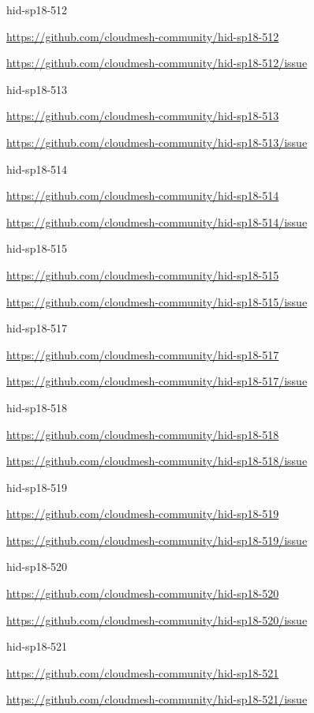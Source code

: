 hid-sp18-512

\url{https://github.com/cloudmesh-community/hid-sp18-512}

\url{https://github.com/cloudmesh-community/hid-sp18-512/issue}


hid-sp18-513

\url{https://github.com/cloudmesh-community/hid-sp18-513}

\url{https://github.com/cloudmesh-community/hid-sp18-513/issue}


hid-sp18-514

\url{https://github.com/cloudmesh-community/hid-sp18-514}

\url{https://github.com/cloudmesh-community/hid-sp18-514/issue}


hid-sp18-515

\url{https://github.com/cloudmesh-community/hid-sp18-515}

\url{https://github.com/cloudmesh-community/hid-sp18-515/issue}


hid-sp18-517

\url{https://github.com/cloudmesh-community/hid-sp18-517}

\url{https://github.com/cloudmesh-community/hid-sp18-517/issue}


hid-sp18-518

\url{https://github.com/cloudmesh-community/hid-sp18-518}

\url{https://github.com/cloudmesh-community/hid-sp18-518/issue}


hid-sp18-519

\url{https://github.com/cloudmesh-community/hid-sp18-519}

\url{https://github.com/cloudmesh-community/hid-sp18-519/issue}


hid-sp18-520

\url{https://github.com/cloudmesh-community/hid-sp18-520}

\url{https://github.com/cloudmesh-community/hid-sp18-520/issue}


hid-sp18-521

\url{https://github.com/cloudmesh-community/hid-sp18-521}

\url{https://github.com/cloudmesh-community/hid-sp18-521/issue}

